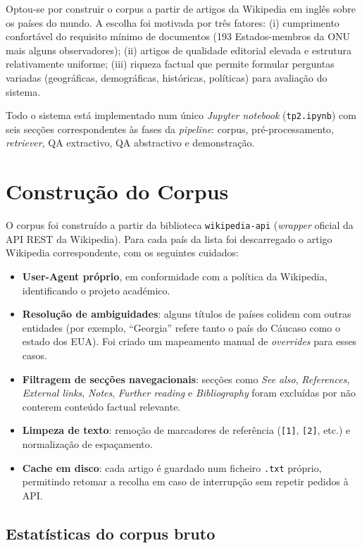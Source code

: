 \documentclass[11pt,a4paper]{article}
\begin{document}
Optou-se por construir o corpus a partir de artigos da Wikipedia em inglês sobre os países do mundo. A escolha foi motivada por três fatores: (i) cumprimento confortável do requisito mínimo de documentos (193 Estados-membros da ONU mais alguns observadores); (ii) artigos de qualidade editorial elevada e estrutura relativamente uniforme; (iii) riqueza factual que permite formular perguntas variadas (geográficas, demográficas, históricas, políticas) para avaliação do sistema.

Todo o sistema está implementado num único \emph{Jupyter notebook} (\texttt{tp2.ipynb}) com seis secções correspondentes às fases da \emph{pipeline}: corpus, pré-processamento, \emph{retriever}, QA extractivo, QA abstractivo e demonstração.

\section{Construção do Corpus}

O corpus foi construído a partir da biblioteca \texttt{wikipedia-api} (\emph{wrapper} oficial da API REST da Wikipedia). Para cada país da lista foi descarregado o artigo Wikipedia correspondente, com os seguintes cuidados:

\begin{itemize}[noitemsep]
    \item \textbf{User-Agent próprio}, em conformidade com a política da Wikipedia, identificando o projeto académico.
    \item \textbf{Resolução de ambiguidades}: alguns títulos de países colidem com outras entidades (por exemplo, ``Georgia'' refere tanto o país do Cáucaso como o estado dos EUA). Foi criado um mapeamento manual de \emph{overrides} para esses casos.
    \item \textbf{Filtragem de secções navegacionais}: secções como \emph{See also}, \emph{References}, \emph{External links}, \emph{Notes}, \emph{Further reading} e \emph{Bibliography} foram excluídas por não conterem conteúdo factual relevante.
    \item \textbf{Limpeza de texto}: remoção de marcadores de referência (\texttt{[1]}, \texttt{[2]}, etc.) e normalização de espaçamento.
    \item \textbf{Cache em disco}: cada artigo é guardado num ficheiro \texttt{.txt} próprio, permitindo retomar a recolha em caso de interrupção sem repetir pedidos à API.
\end{itemize}

\subsection*{Estatísticas do corpus bruto}
\end{document}
